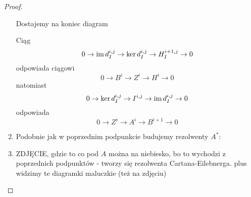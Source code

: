 \begin{proof}
\begin{enumerate}
\begin{center}
\end{center}
      Dostajemy na koniec diagram 
      \begin{center}\end{center}
    Ciąg 
      $$0\to\operatorname{im} d_I^{i,j}\to \ker d_I^{i,j}\to H_I^{i+1,j}\to 0$$ 
      odpowiada ciągowi 
      $$0\to B^i\to Z^i\to H^i\to 0$$
      natomiast 
      $$0\to \ker d_I^{i,j}\to I^{i,j}\to \operatorname{im} d_I^{i,j}\to 0$$
      odpowiada
      $$0\to Z^i\to A^i\to B^{i+1}\to 0$$
    \item Podobnie jak w poprzednim podpunkcie budujemy rezolwenty $A^*$:
      \begin{center}\end{center}
    \item {\large\color{red}ZDJĘCIE}, gdzie to co pod $A$ można na niebiesko, bo to wychodzi z poprzednich podpunktów - tworzy się rezolwenta Cartana-Eilebnerga. plus widzimy te diagramki maluczkie (też na zdjęciu)
  \end{enumerate}
\end{proof}

